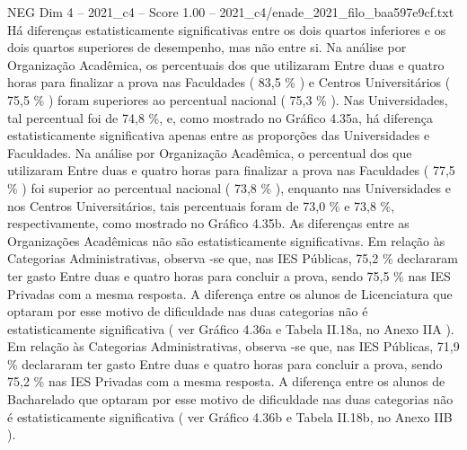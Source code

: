 \begin{textsample}{NEG Dim 4 – 2021\_c4 – Score 1.00 – 2021\_c4/enade\_2021\_filo\_baa597e9cf.txt}
Há diferenças estatisticamente significativas entre os dois quartos inferiores e os dois quartos superiores de desempenho, mas não entre si.
Na análise por Organização Acadêmica, os percentuais dos que utilizaram Entre duas e quatro horas para finalizar a prova nas Faculdades ( 83,5 \% ) e Centros Universitários ( 75,5 \% ) foram superiores ao percentual nacional ( 75,3 \% ).
Nas Universidades, tal percentual foi de 74,8 \%, e, como mostrado no Gráfico 4.35a, há diferença estatisticamente significativa apenas entre as proporções das Universidades e Faculdades.
Na análise por Organização Acadêmica, o percentual dos que utilizaram Entre duas e quatro horas para finalizar a prova nas Faculdades ( 77,5 \% ) foi superior ao percentual nacional ( 73,8 \% ), enquanto nas Universidades e nos Centros Universitários, tais percentuais foram de 73,0 \% e 73,8 \%, respectivamente, como mostrado no Gráfico 4.35b.
As diferenças entre as Organizações Acadêmicas não são estatisticamente significativas.
Em relação às Categorias Administrativas, observa -se que, nas IES Públicas, 75,2 \% declararam ter gasto Entre duas e quatro horas para concluir a prova, sendo 75,5 \% nas IES Privadas com a mesma resposta.
A diferença entre os alunos de Licenciatura que optaram por esse motivo de dificuldade nas duas categorias não é estatisticamente significativa ( ver Gráfico 4.36a e Tabela II.18a, no Anexo IIA ).
Em relação às Categorias Administrativas, observa -se que, nas IES Públicas, 71,9 \% declararam ter gasto Entre duas e quatro horas para concluir a prova, sendo 75,2 \% nas IES Privadas com a mesma resposta.
A diferença entre os alunos de Bacharelado que optaram por esse motivo de dificuldade nas duas categorias não é estatisticamente significativa ( ver Gráfico 4.36b e Tabela II.18b, no Anexo IIB ).

\end{textsample}
